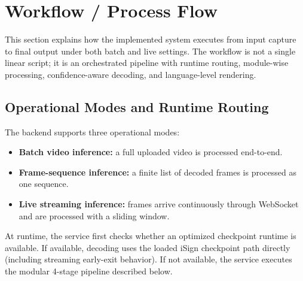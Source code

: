 \section{Workflow / Process Flow}
This section explains how the implemented system executes from input capture to final output under both batch and live settings. The workflow is not a single linear script; it is an orchestrated pipeline with runtime routing, module-wise processing, confidence-aware decoding, and language-level rendering.

\subsection{Operational Modes and Runtime Routing}
The backend supports three operational modes:
\begin{itemize}[leftmargin=1.5em]
\item \textbf{Batch video inference:} a full uploaded video is processed end-to-end.
\item \textbf{Frame-sequence inference:} a finite list of decoded frames is processed as one sequence.
\item \textbf{Live streaming inference:} frames arrive continuously through WebSocket and are processed with a sliding window.
\end{itemize}

At runtime, the service first checks whether an optimized checkpoint runtime is available. If available, decoding uses the loaded iSign checkpoint path directly (including streaming early-exit behavior). If not available, the service executes the modular 4-stage pipeline described below.

